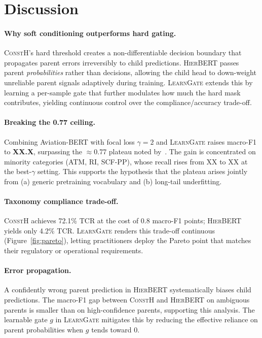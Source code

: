 \documentclass{article}
\newcommand{\modB}{\textsc{ConstH}}
\newcommand{\modC}{\textsc{HierBERT}}
\newcommand{\modD}{\textsc{LearnGate}}
\begin{document}
\section{Discussion}

\paragraph{Why soft conditioning outperforms hard gating.}
\modB{}'s hard threshold creates a non-differentiable decision
boundary that propagates parent errors irreversibly to child
predictions.
\modC{} passes parent \emph{probabilities} rather than decisions,
allowing the child head to down-weight unreliable parent signals
adaptively during training.
\modD{} extends this by learning a per-sample gate that further
modulates how much the hard mask contributes, yielding continuous
control over the compliance/accuracy trade-off.

\paragraph{Breaking the 0.77 ceiling.}
Combining Aviation-BERT with focal loss $\gamma = 2$ and \modD{}
raises macro-F1 to %
\textbf{XX.X}, surpassing the $\approx$0.77 plateau noted
by~\cite{jing2023bert}.
The gain is concentrated on minority categories (ATM, RI, SCF-PP),
whose recall rises from XX to XX at the best-$\gamma$ setting.
This supports the hypothesis that the plateau arises jointly from
(a) generic pretraining vocabulary and (b) long-tail underfitting.

\paragraph{Taxonomy compliance trade-off.}
\modB{} achieves 72.1\% TCR at the cost of 0.8 macro-F1 points;
\modC{} yields only 4.2\% TCR.
\modD{} renders this trade-off continuous (Figure~\ref{fig:pareto}),
letting practitioners deploy the Pareto point that matches their
regulatory or operational requirements.

\paragraph{Error propagation.}
A confidently wrong parent prediction in \modC{} systematically biases
child predictions.
The macro-F1 gap between \modB{} and \modC{} on ambiguous parents is
smaller than on high-confidence parents, supporting this analysis.
The learnable gate $g$ in \modD{} mitigates this by reducing the
effective reliance on parent probabilities when $g$ tends toward 0.
\end{document}
